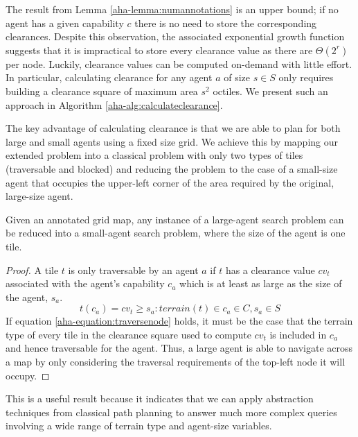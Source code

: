 The result from Lemma \ref{aha-lemma:numannotations} is an upper bound; if no agent has a given capability $c$ there is no need to store the corresponding clearances.
Despite this observation, the associated exponential growth function suggests that it is impractical to store every clearance value as there are $\Theta(2^r)$ per node.
Luckily, clearance values can be computed on-demand with little effort. 
In particular, calculating clearance for any agent $a$ of size $s \in S$ only requires building a clearance square of maximum area $s^2$ octiles. 
We present such an approach in Algorithm \ref{aha-alg:calculateclearance}. 

\par \indent
The key advantage of calculating clearance is that we are able to plan for both large and small agents using a fixed size grid. 
We achieve this by mapping our extended problem into a classical problem with only two types of tiles (traversable and blocked) and reducing the problem to the case of a small-size agent that occupies the upper-left corner of the area required by the original, large-size agent. 
\begin{theorem}
\label{aha-theorem:reducibility}
Given an annotated grid map, any instance of a large-agent search problem can be reduced into a small-agent search problem, where the size of the agent is one tile.
\end{theorem}

\begin{proof}
A tile $t$ is only traversable by an agent $a$ if $t$ has a clearance value $cv_{t}$ associated with the agent's capability $c_{a}$ which is at least as large as the size of the agent, $s_{a}$. 
\begin{equation}
\label{aha-equation:traversenode}
t(c_{a}) = cv_{t} \geq s_{a} : terrain(t) \in c_{a} \in C, s_{a} \in S
\end{equation}
If equation \ref{aha-equation:traversenode} holds, it must be the case that the terrain type of every tile in the clearance square used to compute $cv_{t}$ is included in $c_{a}$ and hence traversable for the agent. 
Thus, a large agent is able to navigate across a map by only considering the traversal requirements of the top-left node it will occupy.
\end{proof}
This is a useful result because it indicates that we can apply abstraction techniques from classical path planning to answer much more complex queries involving a wide range of terrain type and agent-size variables.

